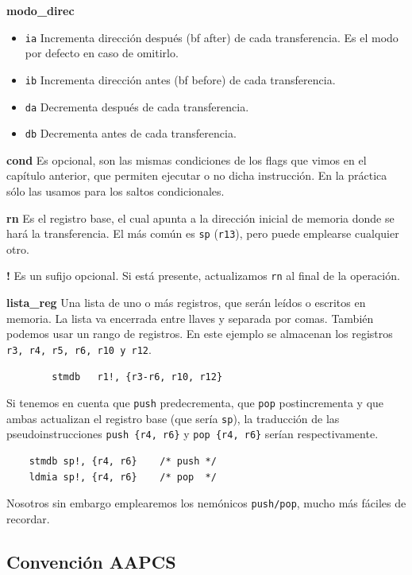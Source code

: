 {\bf modo\_direc}
\begin{itemize}
  \item{\tt ia} Incrementa dirección después ({bf a}fter) de cada transferencia. Es el modo por defecto
                en caso de omitirlo.
  \item{\tt ib} Incrementa dirección antes ({bf b}efore) de cada transferencia.
  \item{\tt da} Decrementa después de cada transferencia.
  \item{\tt db} Decrementa antes de cada transferencia.
\end{itemize}

{\bf cond} Es opcional, son las mismas condiciones de los flags que vimos en el capítulo
          anterior, que permiten ejecutar o no dicha instrucción. En la práctica sólo las
          usamos para los saltos condicionales.

{\bf rn} Es el registro base, el cual apunta a la dirección inicial de memoria donde
          se hará la transferencia. El más común es {\tt sp} ({\tt r13}), pero puede
          emplearse cualquier otro.

{\bf !} Es un sufijo opcional. Si está presente, actualizamos {\tt rn} al final de la operación.

{\bf lista\_reg} Una lista de uno o más registros, que serán leídos o escritos en memoria. La
          lista va encerrada entre llaves y separada por comas. También podemos
          usar un rango de registros. En este ejemplo se almacenan los registros {\tt r3, r4,
          r5, r6, r10 y r12}.

\begin{lstlisting}
        stmdb   r1!, {r3-r6, r10, r12}
\end{lstlisting}

Si tenemos en cuenta que {\tt push} predecrementa, que {\tt pop} postincrementa y que ambas
actualizan el registro base (que sería {\tt sp}), la traducción de las pseudoinstrucciones
{\tt push \{r4, r6\}} y {\tt pop \{r4, r6\}} serían respectivamente.

\begin{lstlisting}
    stmdb sp!, {r4, r6}    /* push */
    ldmia sp!, {r4, r6}    /* pop  */
\end{lstlisting}

Nosotros sin embargo emplearemos los nemónicos {\tt push/pop}, mucho más fáciles de
recordar.

\subsection{Convención AAPCS}

